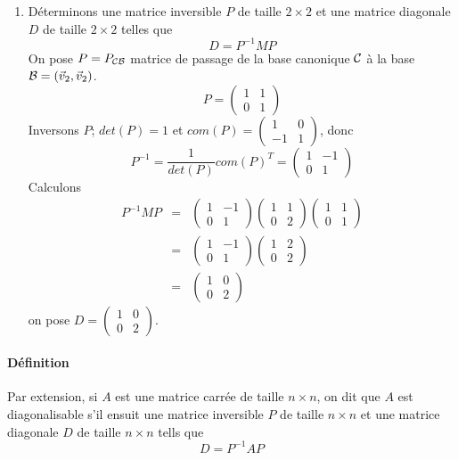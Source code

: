 \begin{enumerate}[(1)]
  \item Déterminons une matrice inversible $P$ de taille $2 \times 2$ et une matrice diagonale $D$ de taille $2 \times 2$ telles que 
    $$D = P^{-1} M P$$
    On pose $P = P_{\mathcal{C} \mathcal{B}}$ matrice de passage de la base canonique $\mathcal{C}$ à la base $\mathcal{B} = (\vec{v}_2, \vec{v}_2)$.
    $$P = \begin{pmatrix} 1 & 1 \\ 0 & 1 \end{pmatrix}$$
    Inversons $P$; $det(P) = 1$ et $com(P) = \begin{pmatrix} 1 & 0 \\ -1 & 1 \end{pmatrix}$, donc
    $$P^{-1} = \frac{1}{det(P)} com(P)^{T} = \begin{pmatrix} 1 & -1 \\ 0 & 1 \end{pmatrix}$$
    Calculons
    \begin{eqnarray*}
      P^{-1} M P &=& \begin{pmatrix} 1 & -1 \\ 0 & 1 \end{pmatrix} \begin{pmatrix} 1 & 1 \\ 0 & 2 \end{pmatrix} \begin{pmatrix} 1 & 1 \\ 0 & 1 \end{pmatrix} \\
        &=& \begin{pmatrix} 1 & -1 \\ 0 & 1 \end{pmatrix} \begin{pmatrix} 1 & 2 \\ 0 & 2 \end{pmatrix} \\
        &=& \begin{pmatrix} 1 & 0 \\ 0 & 2 \end{pmatrix} 
    \end{eqnarray*}
    on pose $D = \begin{pmatrix} 1 & 0 \\ 0 & 2 \end{pmatrix}$.
\end{enumerate}

\paragraph{Définition} Par extension, si $A$ est une matrice carrée de taille $n \times n$, on dit que $A$ est diagonalisable s'il ensuit une matrice inversible $P$ de taille $n \times n$ et une matrice diagonale $D$ de taille $n \times n$ tells que
$$D = P^{-1} A P$$

